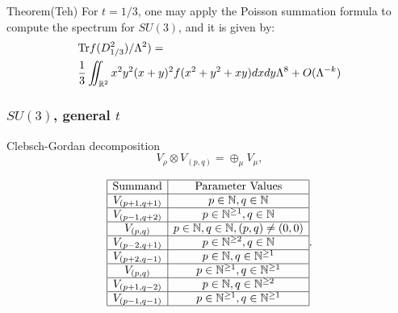 \documentclass{beamer}
\def\N{{\mathbb N}}
\def\R{{\mathbb R}}
\def\Tr{{\rm Tr}}
\begin{document}
\begin{frame}
  \begin{block}{Theorem(Teh)}
    For $t = 1/3$, one may apply the Poisson summation formula to compute the spectrum for $SU(3)$, and it is given by:
    \begin{align*}
      & \Tr f(D_{1/3}^2)/\Lambda ^2) = \\
                                   & \frac{1}{3}\iint_{\R ^2} x^2y^2(x+y)^2f(x^2+y^2+xy)dxdy \Lambda^8 + O(\Lambda ^{-k})
    \end{align*}
  \end{block}
\end{frame}

\begin{frame}
	\frametitle{$SU(3)$, general $t$}
	\begin{block}{Clebsch-Gordan decomposition}
\begin{equation}
V_{\rho} \otimes V_{(p,q)} = \oplus_{\mu} V_{\mu},
\end{equation}

\begin{equation}
\begin{array}{|c|c|}
\hline
\mathrm{Summand} & \mathrm{Parameter~Values}\\
\hline
V_{(p+1,q+1)} & p \in \N, q \in \N\\
\hline
V_{(p-1,q+2)} & p \in \N^{\geq 1}, q \in \N\\
\hline
V_{(p,q)} & p \in \N, q \in \N, (p,q)\neq (0,0) \\
\hline
V_{(p-2,q+1)} & p \in \N^{\geq 2}, q \in \N\\
\hline
V_{(p+2,q-1)} & p \in \N, q \in \N^{\geq 1} \\
\hline
V_{(p,q)} & p \in \N^{\geq 1}, q \in \N^{\geq 1} \\
\hline
V_{(p+1,q-2)} & p \in \N, q \in \N^{\geq 2} \\
\hline
V_{(p-1,q-1)} & p \in \N^{\geq 1}, q \in \N^{\geq 1} \\
\hline
\end{array} .
\end{equation}
	\end{block}
\end{frame}
\end{document}
